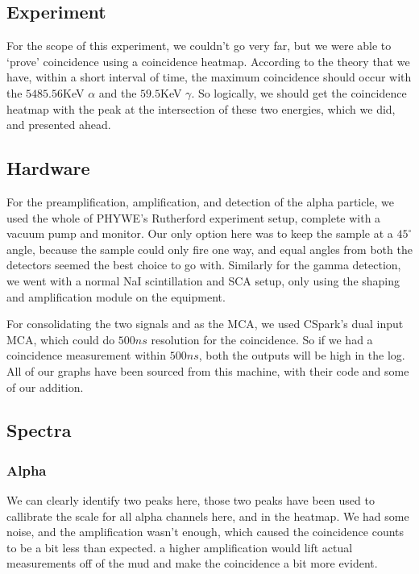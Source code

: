 \documentclass{double}
\begin{document}
\begin{multicols*}{2}
\section{Experiment}
For the scope of this experiment, we couldn't go very far,
but we were able to `prove' coincidence using a coincidence
heatmap. According to the theory that we have, within a
short interval of time, the maximum coincidence should occur
with the $5485.56$KeV $\alpha$ and the $59.5$KeV $\gamma$.
So logically, we should get the coincidence heatmap with the
peak at the intersection of these two energies, which we
did, and presented ahead.

\subsection{Hardware}
For the preamplification, amplification, and detection of
the alpha particle, we used the whole of PHYWE's Rutherford
experiment setup, complete with a vacuum pump and monitor.
Our only option here was to keep the sample at a
$45^{\circ}$ angle, because the sample could only fire one
way, and equal angles from both the detectors seemed the
best choice to go with. Similarly for the gamma detection,
we went with a normal NaI scintillation and SCA setup, only
using the shaping and amplification module on the equipment. 

For consolidating the two signals and as the MCA, we used
CSpark's dual input MCA, which could do $500ns$ resolution
for the coincidence. So if we had a coincidence measurement
within $500ns$, both the outputs will be high in the log.
All of our graphs have been sourced from this machine, with
their code and some of our addition.

\subsection{Spectra}
\subsubsection{Alpha}
We can clearly identify two peaks here, those two peaks have
been used to callibrate the scale for all alpha channels
here, and in the heatmap. We had some noise, and the
amplification wasn't enough, which caused the coincidence
counts to be a bit less than expected. a higher
amplification would lift actual measurements off of the mud
and make the coincidence a bit more evident.
\begin{figure}[H]
	\centering
	\resizebox{0.8\columnwidth}{!}{%
		
	}
\end{figure}



\end{multicols*}
\end{document}
